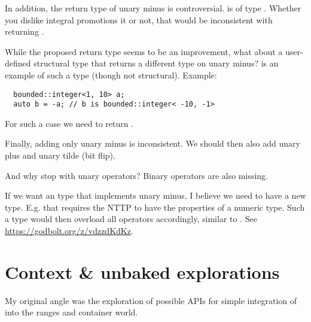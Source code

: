 In addition, the return type of unary minus is controversial.
 is of type .
Whether you dislike integral promotions it or not, that would be inconsistent
with  returning
.

While the proposed return type seems to be an improvement, what about a
user-defined structural type that returns a different type on unary minus?
 \cite{site.bounded-integer} is an example of such a
type (though not structural).
Example:
\medskip\begin{lstlisting}
  bounded::integer<1, 10> a;
  auto b = -a; // b is bounded::integer< -10, -1>
\end{lstlisting}
For such a case we need  to return
.

Finally, adding only unary minus is inconsistent.
We should then also add unary plus and unary tilde (bit flip).

And why stop with unary operators?
Binary operators are also missing.

If we want an  type that implements unary minus, I
believe we need to have a new type.
E.g.  that requires the NTTP to have the properties of a numeric type.
Such a type would then overload all operators accordingly, similar to .
See \url{https://godbolt.org/z/vdzzdKdKz}.


\section{Context \& unbaked explorations}
My original angle was the exploration of possible APIs for simple integration
of  into the ranges and container world.

